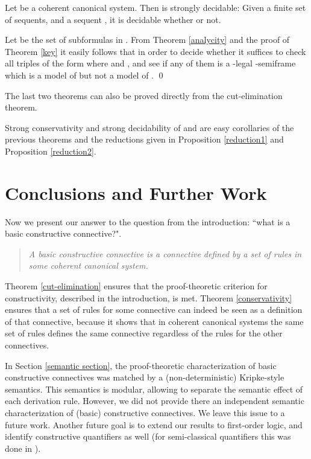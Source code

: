 \documentclass{LMCS}
\theoremstyle{remark}
\begin{document}
\begin{enumerate}[(a)]
\begin{enumerate}[\bf(a):]
\begin{thm}[Decidability]
\label{decidability} 
Let  be a coherent canonical system. 
Then  is strongly decidable:
Given a finite set  of sequents, and a sequent ,
it is decidable whether  or not.
\end{thm}
\proof
Let  be the set of subformulas in
. From Theorem \ref{analycity} and the proof
of Theorem \ref{key} it easily follows that
in order to decide whether 
it suffices to check all triples of the form 
where  and 
,
and see if any of them is a -legal -semiframe
which is a model of  but not a model of .
\qed

\begin{rem}
The last two theorems can also be proved directly 
from the cut-elimination theorem.
\end{rem}

Strong conservativity and strong decidability of  and  
are easy corollaries of the previous theorems and the reductions given in 
Proposition \ref{reduction1} and Proposition \ref{reduction2}.

\section{Conclusions and Further Work}

Now we present our answer to the question from the introduction:
``what is a basic constructive connective?".

\smallskip
\begin{quote}
{\em A basic constructive connective is a connective 
defined by a set of rules in some coherent canonical system.}
\end{quote}

\smallskip\noindent
Theorem \ref{cut-elimination} ensures that the proof-theoretic criterion for constructivity, described in the
introduction, is met. Theorem \ref{conservativity}
ensures that a set of rules for some connective can indeed be seen as a definition of that connective, 
because it shows that in coherent canonical systems the same set of rules defines the same connective
regardless of the rules for the other connectives.



In Section \ref{semantic section}, the proof-theoretic characterization of basic constructive connectives 
was matched by a (non-deterministic) Kripke-style semantics. This semantics is modular, allowing to separate
the semantic effect of each derivation rule. However, we did not provide there
an independent semantic characterization
of (basic) constructive connectives. 
We leave this issue to a future work.
Another future goal is to extend our results to first-order logic, 
and identify constructive quantifiers as well
(for semi-classical quantifiers this was done in \cite{AZ08}).


\end{enumerate}
\end{enumerate}
\end{document}

